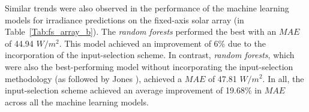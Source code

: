 \par Similar trends were also observed in the performance of the machine learning models for irradiance predictions on the fixed-axis solar array (in Table~\ref{Tab:fs_array_b}). The \textit{random forests} performed the best with an $MAE$ of 44.94 $W/m^2$. This model achieved an improvement of 6\% due to the incorporation of the input-selection scheme. In contrast, \textit{random forests}, which were also the best-performing model without incorporating the input-selection methodology (as followed by Jones \cite{thesis_zach}), achieved a $MAE$ of 47.81 $W/m^2$. In all, the input-selection scheme achieved an average improvement of 19.68\% in $MAE$ across all the machine learning models.

\vspace{1em}

